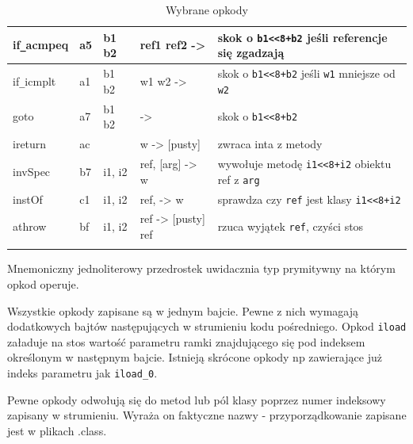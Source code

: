 \documentclass[a4paper,12pt]{article}
\begin{document}
\begin{longtable}{|l|l|l|l|l|}
  \hline
  if\verb|_|acmpeq & a5 & b1 b2 & ref1 ref2 -> & skok o \verb|b1<<8+b2| jeśli referencje się zgadzają\\
  \hline
  if\verb|_|icmplt & a1 & b1 b2 & w1 w2 -> & skok o \verb|b1<<8+b2| jeśli \verb|w1| mniejsze od \verb|w2|\\
  \hline
  goto & a7 & b1 b2 & -> & skok o \verb|b1<<8+b2|\\
  \hline
  ireturn & ac &  & w -> [pusty] & zwraca inta z metody\\
  \hline
  invSpec & b7 & i1, i2 & ref, [arg] -> w & wywołuje metodę \verb|i1<<8+i2| obiektu ref z \verb|arg|\\
  \hline
  instOf & c1 & i1, i2 & ref, -> w & sprawdza czy \verb|ref| jest klasy \verb|i1<<8+i2|\\
  \hline
  athrow & bf & i1, i2 & ref -> [pusty] ref & rzuca wyjątek \verb|ref|, czyści stos \\
  \hline  
\caption{Wybrane opkody} \label{tab:tags}\\
\end{longtable}

Mnemoniczny jednoliterowy przedrostek uwidacznia typ prymitywny na którym opkod operuje. 

Wszystkie opkody zapisane są w jednym bajcie. Pewne z nich wymagają dodatkowych bajtów następujących w strumieniu kodu pośredniego. Opkod \verb|iload| załaduje na stos wartość parametru ramki znajdującego się pod indeksem określonym w następnym bajcie. Istnieją skrócone opkody np zawierające już indeks parametru jak \verb|iload_0|.

Pewne opkody odwołują się do metod lub pól klasy poprzez numer indeksowy zapisany w strumieniu. Wyraża on faktyczne nazwy - przyporządkowanie zapisane jest w plikach .class.
\end{document}

